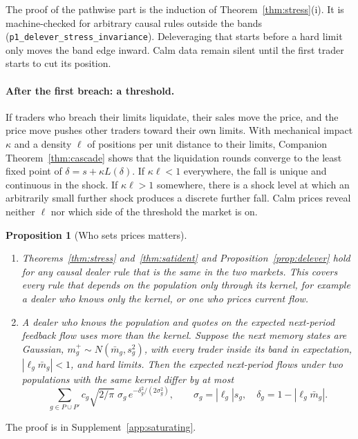 \documentclass[12pt]{article}
\newtheorem{proposition}[theorem]{Proposition}
\theoremstyle{definition}
\theoremstyle{remark}
\begin{document}
The proof of the pathwise part is the induction of Theorem~\ref{thm:stress}(i). It is machine-checked for arbitrary causal rules outside the bands (\texttt{p1\_delever\_stress\_invariance}). Deleveraging that starts before a hard limit only moves the band edge inward. Calm data remain silent until the first trader starts to cut its position.

\paragraph{After the first breach: a threshold.} If traders who breach their limits liquidate, their sales move the price, and the price move pushes other traders toward their own limits. With mechanical impact $\kappa$ and a density $\ell$ of positions per unit distance to their limits, Companion Theorem~\ref{thm:cascade} shows that the liquidation rounds converge to the least fixed point of $\delta=s+\kappa L(\delta)$. If $\kappa\ell<1$ everywhere, the fall is unique and continuous in the shock. If $\kappa\ell>1$ somewhere, there is a shock level at which an arbitrarily small further shock produces a discrete further fall. Calm prices reveal neither $\ell$ nor which side of the threshold the market is on.

\begin{proposition}[Who sets prices matters]\label{prop:dealers}
\begin{enumerate}[label=(\roman*),itemsep=1pt]
\item Theorems~\ref{thm:stress} and~\ref{thm:satident} and Proposition~\ref{prop:delever} hold for any causal dealer rule that is the same in the two markets. This covers every rule that depends on the population only through its kernel, for example a dealer who knows only the kernel, or one who prices current flow.
\item A dealer who knows the population and quotes on the expected next-period feedback flow uses more than the kernel. Suppose the next memory states are Gaussian, $m^+_g\sim N(\bar m_g,s_g^2)$, with every trader inside its band in expectation, $|\ell_g\bar m_g|<1$, and hard limits. Then the expected next-period flows under two populations with the same kernel differ by at most
\[
 \sum_{g\in P\cup P'}c_g\sqrt{2/\pi}\;\sigma_g\,e^{-\delta_g^2/(2\sigma_g^2)},\qquad \sigma_g=|\ell_g|s_g,\quad\delta_g=1-|\ell_g\bar m_g|.
\]
\end{enumerate}
\end{proposition}

The proof is in Supplement~\ref{app:saturating}.
\end{document}
